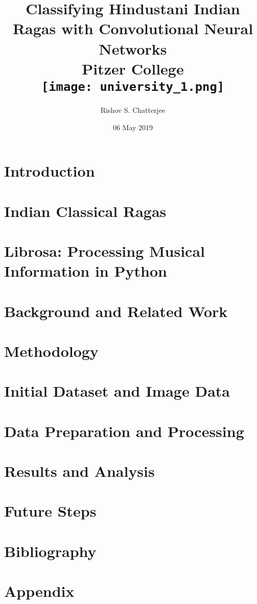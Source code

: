 \documentclass[12pt]{report}
\title{
{Classifying Hindustani Indian Ragas with Convolutional Neural Networks}\\
{\large Pitzer College}\\
{\texttt{[image: university\_1.png]}}
}
\author{Rishov S. Chatterjee}
\date{06 May 2019}
\begin{document}
\maketitle{}
\chapter*{\centering Introduction}


\chapter*{\centering Indian Classical Ragas}


\chapter*{\centering Librosa: Processing Musical Information in Python}


\chapter*{\centering Background and Related Work}


\chapter*{\centering Methodology}


\chapter*{\centering Initial Dataset and Image Data}


\chapter*{\centering Data Preparation and Processing}


\chapter*{\centering Results and Analysis}


\chapter*{\centering Future Steps}


\chapter*{\centering Bibliography}


\chapter*{\centering Appendix}

\end{document}
